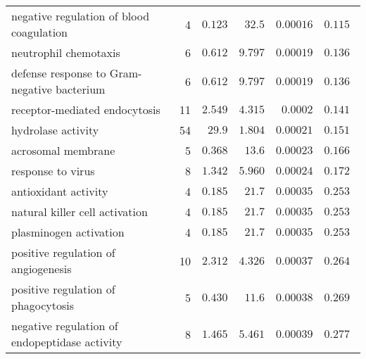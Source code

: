 \begin{longtable}{|l|r|r|r|r|r|}
          negative regulation of blood coagulation &                       4 &                $ 0.123$ &   $  32.5$ &            $0.00016$ &                     $ 0.115~~$ \\
                             neutrophil chemotaxis &                       6 &                $ 0.612$ &   $ 9.797$ &            $0.00019$ &                     $ 0.136~~$ \\
       defense response to Gram-negative bacterium &                       6 &                $ 0.612$ &   $ 9.797$ &            $0.00019$ &                     $ 0.136~~$ \\
                     receptor-mediated endocytosis &                      11 &                $ 2.549$ &   $ 4.315$ &             $0.0002$ &                     $ 0.141~~$ \\
                                hydrolase activity &                      54 &                $  29.9$ &   $ 1.804$ &            $0.00021$ &                     $ 0.151~~$ \\
                                acrosomal membrane &                       5 &                $ 0.368$ &   $  13.6$ &            $0.00023$ &                     $ 0.166~~$ \\
                                 response to virus &                       8 &                $ 1.342$ &   $ 5.960$ &            $0.00024$ &                     $ 0.172~~$ \\
                              antioxidant activity &                       4 &                $ 0.185$ &   $  21.7$ &            $0.00035$ &                     $ 0.253~~$ \\
                    natural killer cell activation &                       4 &                $ 0.185$ &   $  21.7$ &            $0.00035$ &                     $ 0.253~~$ \\
                            plasminogen activation &                       4 &                $ 0.185$ &   $  21.7$ &            $0.00035$ &                     $ 0.253~~$ \\
               positive regulation of angiogenesis &                      10 &                $ 2.312$ &   $ 4.326$ &            $0.00037$ &                     $ 0.264~~$ \\
               positive regulation of phagocytosis &                       5 &                $ 0.430$ &   $  11.6$ &            $0.00038$ &                     $ 0.269~~$ \\
     negative regulation of endopeptidase activity &                       8 &                $ 1.465$ &   $ 5.461$ &            $0.00039$ &                     $ 0.277~~$ \\

\end{longtable}

